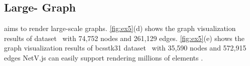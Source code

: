 \subsection{Large- Graph}
\name aims to render large-scale graphs. \autoref{fig:ex5}(d) shows the graph visualization results of  dataset~\cite{davis2011university} with 74,752 nodes and 261,129 edges. \autoref{fig:ex5}(e) shows the graph visualization results of  bcsstk31 dataset~\cite{davis2011university} with 35,590 nodes and 572,915 edges NetV.js can easily support  rendering millions of elements .





